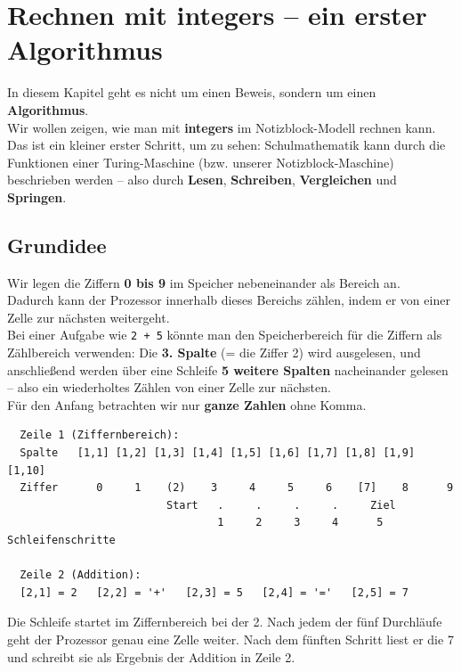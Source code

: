 \documentclass{article}
\begin{document}
\section{Rechnen mit integers – ein erster Algorithmus}
        
  In diesem Kapitel geht es nicht um einen Beweis, sondern um einen \textbf{Algorithmus}.\\
            Wir wollen zeigen, wie man mit \textbf{integers} im Notizblock-Modell rechnen kann.\\
            Das ist ein kleiner erster Schritt, um zu sehen: Schulmathematik kann durch die Funktionen einer Turing-Maschine (bzw. unserer Notizblock-Maschine) beschrieben werden – also durch \textbf{Lesen}, \textbf{Schreiben}, \textbf{Vergleichen} und \textbf{Springen}.


          \subsection{Grundidee}

        
  Wir legen die Ziffern \textbf{0 bis 9} im Speicher nebeneinander als Bereich an.\\
            Dadurch kann der Prozessor innerhalb dieses Bereichs zählen, indem er von einer Zelle zur nächsten weitergeht.\\
            Bei einer Aufgabe wie \texttt{2 + 5} könnte man den Speicherbereich für die Ziffern als Zählbereich verwenden: Die \textbf{3. Spalte} (= die Ziffer 2) wird ausgelesen, und anschließend werden über eine Schleife \textbf{5 weitere Spalten} nacheinander gelesen – also ein wiederholtes Zählen von einer Zelle zur nächsten.\\
            Für den Anfang betrachten wir nur \textbf{ganze Zahlen} ohne Komma.

\begin{verbatim}
  Zeile 1 (Ziffernbereich):
  Spalte   [1,1] [1,2] [1,3] [1,4] [1,5] [1,6] [1,7] [1,8] [1,9] [1,10]
  Ziffer      0     1    (2)    3     4     5     6    [7]    8      9
                         Start   .     .     .     .     Ziel
                                 1     2     3     4      5   Schleifenschritte

  Zeile 2 (Addition):
  [2,1] = 2   [2,2] = '+'   [2,3] = 5   [2,4] = '='   [2,5] = 7
\end{verbatim}

Die Schleife startet im Ziffernbereich bei der 2. Nach jedem der fünf Durchläufe geht der Prozessor genau eine Zelle weiter. Nach dem fünften Schritt liest er die 7 und schreibt sie als Ergebnis der Addition in Zeile 2.
\end{document}
